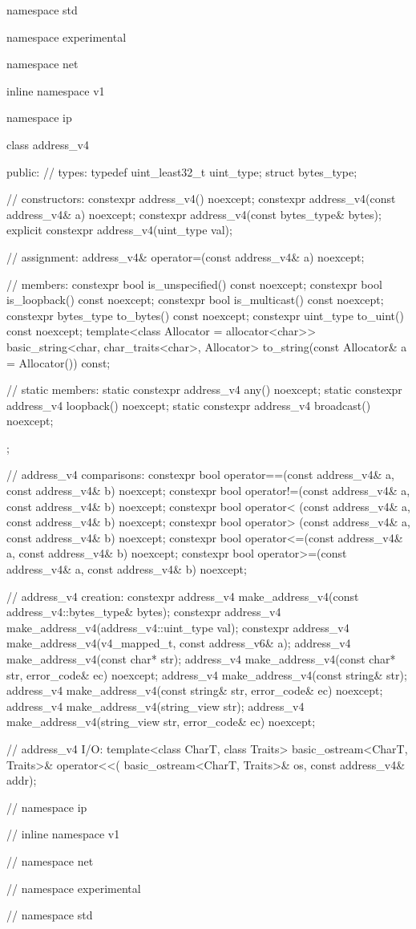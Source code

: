 \begin{codeblock}
namespace std {
namespace experimental {
namespace net {
inline namespace v1 {
namespace ip {

  class address_v4
  {
  public:
    // types:
    typedef uint_least32_t uint_type;
    struct bytes_type;

    // constructors:
    constexpr address_v4() noexcept;
    constexpr address_v4(const address_v4& a) noexcept;
    constexpr address_v4(const bytes_type& bytes);
    explicit constexpr address_v4(uint_type val);

    // assignment:
    address_v4& operator=(const address_v4& a) noexcept;

    // members:
    constexpr bool is_unspecified() const noexcept;
    constexpr bool is_loopback() const noexcept;
    constexpr bool is_multicast() const noexcept;
    constexpr bytes_type to_bytes() const noexcept;
    constexpr uint_type to_uint() const noexcept;
    template<class Allocator = allocator<char>>
      basic_string<char, char_traits<char>, Allocator>
        to_string(const Allocator& a = Allocator()) const;

    // static members:
    static constexpr address_v4 any() noexcept;
    static constexpr address_v4 loopback() noexcept;
    static constexpr address_v4 broadcast() noexcept;
  };

  // address_v4 comparisons:
  constexpr bool operator==(const address_v4& a, const address_v4& b) noexcept;
  constexpr bool operator!=(const address_v4& a, const address_v4& b) noexcept;
  constexpr bool operator< (const address_v4& a, const address_v4& b) noexcept;
  constexpr bool operator> (const address_v4& a, const address_v4& b) noexcept;
  constexpr bool operator<=(const address_v4& a, const address_v4& b) noexcept;
  constexpr bool operator>=(const address_v4& a, const address_v4& b) noexcept;

  // address_v4 creation:
  constexpr address_v4 make_address_v4(const address_v4::bytes_type& bytes);
  constexpr address_v4 make_address_v4(address_v4::uint_type val);
  constexpr address_v4 make_address_v4(v4_mapped_t, const address_v6& a);
  address_v4 make_address_v4(const char* str);
  address_v4 make_address_v4(const char* str, error_code& ec) noexcept;
  address_v4 make_address_v4(const string& str);
  address_v4 make_address_v4(const string& str, error_code& ec) noexcept;
  address_v4 make_address_v4(string_view str);
  address_v4 make_address_v4(string_view str, error_code& ec) noexcept;

  // address_v4 I/O:
  template<class CharT, class Traits>
    basic_ostream<CharT, Traits>& operator<<(
      basic_ostream<CharT, Traits>& os, const address_v4& addr);

} // namespace ip
} // inline namespace v1
} // namespace net
} // namespace experimental
} // namespace std
\end{codeblock}

